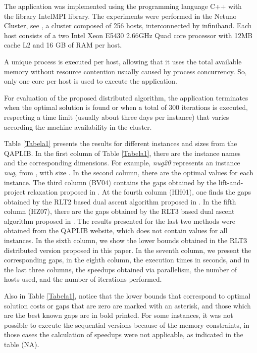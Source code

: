 \documentclass[authoryear,12pt,a4paper,times]{elsarticle}
\begin{document}
The application was implemented using the programming language C++ with the library IntelMPI library.
The experiments were performed in the 
Netuno Cluster, see \citet{netuno2011}, a cluster composed of 256 hosts, interconnected by infiniband.
Each host consists of a two Intel Xeon E5430 2.66GHz
Quad core processor with 12MB cache L2 and 16 GB of RAM per host. 

A unique process is executed per host, allowing that it  uses  the total available memory  without resource contention
usually caused by process concurrency. So,  only one core per host is used to execute the application.   
 
For evaluation of the proposed distributed algorithm, the application terminates when the optimal solution
is found or when a total of 300 iterations is executed, respecting a time limit (usually about three days
per instance) that varies according the machine availability in the cluster.


Table \ref{Tabela1} presents the results for different instances and sizes from the QAPLIB.
In the first column of Table \ref{Tabela1}, there are the instance names and the corresponding dimensions.
For example, \textit{nug20} represents an instance \textit{nug}, from  \citet{nug68}, with size . 
In the second column, there are the optimal values for each instance.
The third column (BV04) contains the gaps obtained by the lift-and-project relaxation proposed in
\citet{burer2006}.
At the fourth column (HH01), one finds the gaps obtained by the RLT2 based dual ascent algorithm proposed
in \citet{adams2007}. 
In the fifth column (HZ07), there are the gaps obtained by the RLT3 based dual ascent algorithm proposed
in \citet{hahn2012}.
The results presented for the last two methods were obtained from the QAPLIB website, which does not contain
values for all instances.
In the sixth column, we show the lower bounds obtained in the RLT3 distributed version proposed in this paper.
In the seventh column, we present the corresponding gaps, in the eighth column, the execution times in seconds,
and in the last three columns, the speedups obtained via parallelism, the number of hosts used, and the number
of iterations performed.

Also in Table \ref{Tabela1}, notice that the lower bounds that correspond to optimal solution costs or gaps
that are zero are marked with an asterisk, and those which are the best known gaps are in bold printed.
For some instances, it was not possible to execute the sequential versions because of the memory constraints, in those cases the calculation of speedups were not applicable, as indicated in the table (NA).
\end{document}
